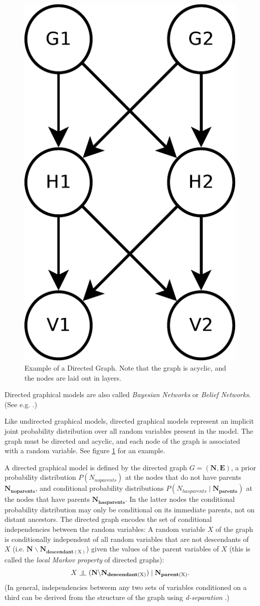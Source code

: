 \begin{figure}
\begin{centering}
\includegraphics[width=0.3\columnwidth]{images/directed-graphical-model-example}
\par\end{centering}
\caption[Example of a Directed Graph.]{\label{fig:Example-of-a-Directed-Graph}Example of a Directed Graph.
Note that the graph is acyclic, and the nodes are laid out in layers.}
\end{figure}

Directed graphical models are also called \emph{Bayesian Networks}
or \emph{Belief Networks}. (See e.g. \cite{KollerTaskar2007,Neal1992}.)

Like undirected graphical models, directed graphical models represent
an implicit joint probability distribution over all random variables
present in the model. The graph must be directed and acyclic, and
each node of the graph is associated with a random variable. See figure
\ref{fig:Example-of-a-Directed-Graph} for an example.

A directed graphical model is defined by the directed graph $G=(\mathbf{N},\mathbf{E})$,
a prior probability distribution $P(N_{noparents})$ at the nodes
that do not have parents $\mathbf{N_{noparents}}$, and conditional
probability distributions $P(N_{hasparents}\mid\mathbf{N_{parents}})$
at the nodes that have parents $\mathbf{N_{hasparents}}$. In the
latter nodes the conditional probability distribution may only be
conditional on its immediate parents, not on distant ancestors. The
directed graph encodes the set of conditional independencies between
the random variables: A random variable $X$ of the graph is conditionally
independent of all random variables that are not descendants of $X$
(i.e. $\mathbf{N}\backslash\mathbf{N_{descendant(\mathbf{\mathrm{X}})}}$)
given the values of the parent variables of $X$ (this is called the
\emph{local Markov property} of directed
graphs):
\[
X\,\,\indep\,\,(\mathbf{N}\backslash\mathbf{N_{descendant(\mathrm{X})}})\mid\mathbf{N_{parent(\mathrm{X})}}.
\]
(In general, independencies betweem any two sets of variables conditioned
on a third can be derived from the structure of the graph using \emph{d-separation}
\cite{Barber2012}.)

